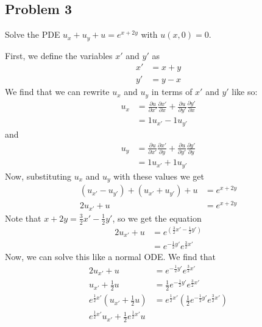 \documentclass{ben}
\begin{document}
\subsection{Problem 3}
\noindent
Solve the PDE $u_x + u_y + u = e^{x + 2y}$ with $u(x, 0) = 0$.
\begin{solution}
    First, we define the variables $x'$ and $y'$ as
    \begin{align*}
        x' &= x + y\\
        y' &= y - x
    \end{align*}
    We find that we can rewrite $u_x$ and $u_y$ in terms of $x'$ and $y'$ like so:
    \begin{align*}
        u_x &= \frac{\partial u}{\partial x'} \frac{\partial x'}{\partial x} + \frac{\partial u}{\partial y'} \frac{\partial y'}{\partial x}\\
        &= 1 u_{x'} - 1 u_{y'}
    \end{align*}
    and
    \begin{align*}
        u_y &= \frac{\partial u}{\partial x'} \frac{\partial x'}{\partial y} + \frac{\partial u}{\partial y'} \frac{\partial y'}{\partial y}\\
        &= 1 u_{x'} + 1 u_{y'}
    \end{align*}
    Now, substituting $u_x$ and $u_y$ with these values we get
    \begin{align*}
        \left( u_{x'} - u_{y'} \right) + \left( u_{x'} + u_{y'} \right) + u &= e^{x + 2y}\\
        2 u_{x'} + u &= e^{x + 2y}
    \end{align*}
    Note that $x + 2y = \frac{3}{2}x' - \frac{1}{2}y'$, so we get the equation
    \begin{align*}
        2 u_{x'} + u &= e^{\left(\frac{3}{2}x' - \frac{1}{2}y'\right)}\\
        &= e^{-\frac{1}{2}y'}e^{\frac{3}{2}x'}
    \end{align*}
    Now, we can solve this like a normal ODE. We find that
    \begin{align*}
        2u_{x'} + u &= e^{-\frac{1}{2}y'}e^{\frac{3}{2}x'}\\
        u_{x'} + \frac{1}{2}u &= \frac{1}{2} e^{-\frac{1}{2}y'}e^{\frac{3}{2}x'}\\
        e^{\frac{1}{2}x'}\left(u_{x'} + \frac{1}{2}u\right)
        &= e^{\frac{1}{2}x'}\left(\frac{1}{2}e^{-\frac{1}{2}y'}e^{\frac{3}{2}x'}\right)\\
        e^{\frac{1}{2}x'} u_{x'} + \frac{1}{2} e^{\frac{1}{2}x'} u

\end{align*}
\end{solution}
\end{document}
